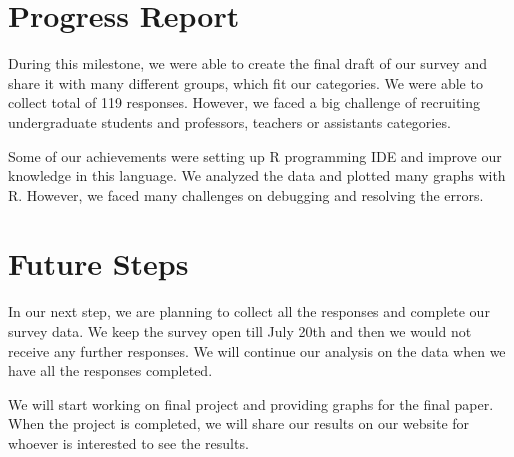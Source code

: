 \documentclass{sigchi}
\begin{document}
\section{Progress Report}
During this milestone, we were able to create the final draft of our survey and share it with many different groups, which fit our categories. We were able to collect total of 119 responses. However, we faced a big challenge of recruiting undergraduate students and professors, teachers or assistants categories.

Some of our achievements were setting up R programming IDE and improve our knowledge in this language. We analyzed the data and plotted many graphs with R. However, we faced many challenges on debugging and resolving the errors.

 \section{Future Steps}
In our next step, we are planning to collect all the responses and complete our survey data. We keep the survey open till July 20th and then we would not receive any further responses. We will continue our analysis on the data when we have all the responses completed.

We will start working on final project and providing graphs for the final paper. When the project is completed, we will share our results on our website for whoever is interested to see the results.

 

\balance{}

\balance{}

%
%
\end{document}
